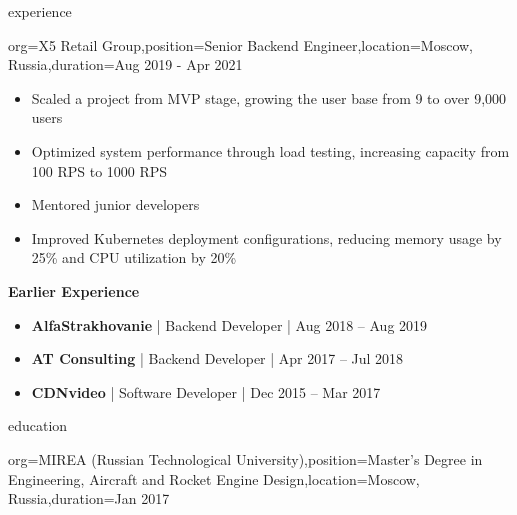 \documentclass{resume}
\begin{document}
\begin{ResumeSection}{experience}
\begin{ResumeSubsection}{org=X5 Retail Group,position=Senior Backend Engineer,location={Moscow, Russia},duration=Aug 2019 - Apr 2021}
    \begin{itemize}
        \item Scaled a project from MVP stage, growing the user base from 9 to over 9,000 users
        \item Optimized system performance through load testing, increasing capacity from 100 RPS to 1000 RPS
        \item Mentored junior developers
        \item Improved Kubernetes deployment configurations, reducing memory usage by 25\% and CPU utilization by 20\%
    \end{itemize}
\end{ResumeSubsection}

    \textbf{Earlier Experience}
    \begin{itemize}
        \item \textbf{AlfaStrakhovanie} | Backend Developer | Aug 2018 -- Aug 2019
        \item \textbf{AT Consulting} | Backend Developer | Apr 2017 -- Jul 2018
        \item \textbf{CDNvideo} | Software Developer | Dec 2015 -- Mar 2017
    \end{itemize}
\end{ResumeSection}

\begin{ResumeSection}{education}
    \begin{ResumeSubsection}{org={MIREA (Russian Technological University)},position={Master's Degree in Engineering, Aircraft and Rocket Engine Design},location={Moscow, Russia},duration=Jan 2017}
    \end{ResumeSubsection}
\end{ResumeSection}
\end{document}
